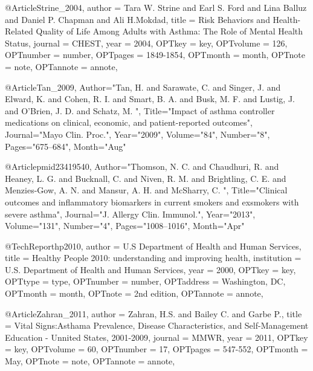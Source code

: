 {{{@Article{Strine_2004,
author = {Tara W. Strine and Earl S. Ford and Lina Balluz and Daniel P. Chapman and Ali H.Mokdad},
title = {Risk Behaviors and Health-Related Quality of Life Among Adults with Asthma: The Role of Mental Health Status},
journal = {CHEST},
year = {2004},
OPTkey = {key},
OPTvolume = {126},
OPTnumber = {number},
OPTpages = {1849-1854},
OPTmonth = {month},
OPTnote = {note},
OPTannote = {annote},
}


@Article{Tan_2009,
   Author="Tan, H.  and Sarawate, C.  and Singer, J.  and Elward, K.  and Cohen, R. I.  and Smart, B. A.  and Busk, M. F.  and Lustig, J.  and O'Brien, J. D.  and Schatz, M. ",
   Title="{{I}mpact of asthma controller medications on clinical, economic, and patient-reported outcomes}",
   Journal="Mayo Clin. Proc.",
   Year="2009",
   Volume="84",
   Number="8",
   Pages="675--684",
   Month="Aug"
}

@Article{pmid23419540,
   Author="Thomson, N. C.  and Chaudhuri, R.  and Heaney, L. G.  and Bucknall, C.  and Niven, R. M.  and Brightling, C. E.  and Menzies-Gow, A. N.  and Mansur, A. H.  and McSharry, C. ",
   Title="{{C}linical outcomes and inflammatory biomarkers in current smokers and exsmokers with severe asthma}",
   Journal="J. Allergy Clin. Immunol.",
   Year="2013",
   Volume="131",
   Number="4",
   Pages="1008--1016",
   Month="Apr"
}


@TechReport{hp2010,
author = {{U.S Department of Health and Human Services}},
title = {Healthy People 2010: understanding and improving health},
institution = {U.S. Department of Health and Human Services},
year = {2000},
OPTkey = {key},
OPTtype = {type},
OPTnumber = {number},
OPTaddress = {Washington, DC},
OPTmonth = {month},
OPTnote = {2nd edition},
OPTannote = {annote},
}







@Article{Zahran_2011,
author = {Zahran, H.S. and Bailey C. and Garbe P.},
title = {Vital Signs:Asthama Prevalence, Disease Characteristics, and Self-Management Education - Unnited States, 2001-2009},
journal = {MMWR},
year = {2011},
OPTkey = {key},
OPTvolume = {60},
OPTnumber = {17},
OPTpages = {547-552},
OPTmonth = {May},
OPTnote = {note},
OPTannote = {annote},
}





}}}
